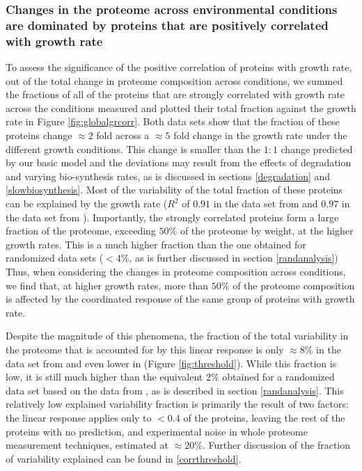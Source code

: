 \documentclass{article}
\newcommand{\hGlobalSumRsq}{0.91}
\newcommand{\vnGlobalSumRsq}{0.97}
\newcommand{\vGlobalSumRsq}{\vnGlobalSumRsq{}}
\begin{document}
\subsubsection{Changes in the proteome across environmental conditions are dominated by proteins that are positively correlated with growth rate}
To assess the significance of the positive correlation of proteins with growth rate, out of the total change in proteome composition across conditions, we summed the fractions of all of the proteins that are strongly correlated with growth rate across the conditions measured and plotted their total fraction against the growth rate in Figure \ref{fig:globalgrcorr}.
Both data sets show that the fraction of these proteins change $\approx 2$ fold across a $\approx 5$ fold change in the growth rate under the different growth conditions.
This change is smaller than the $1:1$ change predicted by our basic model and the deviations may result from the effects of degradation and varying bio-synthesis rates, as is discussed in sections \ref{degradation} and \ref{slowbiosynthesis}.
Most of the variability of the total fraction of these proteins can be explained by the growth rate ($R^2$ of $\hGlobalSumRsq$ in the data set from \cite{Heinemann2015} and $\vGlobalSumRsq$ in the data set from \cite{Peebo_2015}). 
Importantly, the strongly correlated proteins form a large fraction of the proteome, exceeding $50\%$ of the proteome by weight, at the higher growth rates.
This is a much higher fraction than the one obtained for randomized data sets ($<4\%$, as is further discussed in section \ref{randanalysis})
Thus, when considering the changes in proteome composition across conditions, we find that, at higher growth rates, more than $50\%$ of the proteome composition is affected by the coordinated response of the same group of proteins with growth rate.

Despite the magnitude of this phenomena, the fraction of the total variability in the proteome that is accounted for by this linear response is only $\approx 8\%$  in the data set from \cite{Heinemann2015} and even lower in \cite{Peebo_2015} (Figure \ref{fig:threshold}).
While this fraction is low, it is still much higher than the equivalent $2\%$ obtained for a randomized data set based on the data from \cite{Heinemann2015}, as is described in section \ref{randanalysis}.
This relatively low explained variability fraction is primarily the result of two factors: the linear response applies only to $<0.4$ of the proteins, leaving the rest of the proteins with no prediction, and experimental noise in whole proteome measurement techniques, estimated at $\approx20\%$.
Further discussion of the fraction of variability explained can be found in \ref{corrthreshold}.
\end{document}
